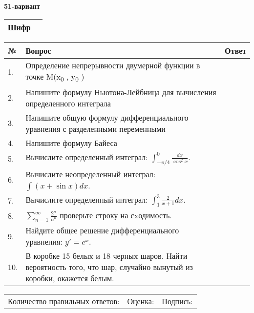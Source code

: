 \documentclass{article}
\begin{document}
  \egroup
  
  \newpage
  
  
  \textbf{51-вариант}\\
  
  \bgroup
  \def\arraystretch{1.6} %
  
  \begin{tabular}{|m{5.7cm}|m{9.5cm}|}
  \hline
  Шифр & \\
  \hline
  \end{tabular}
  
  \vspace{1cm}
  
  \begin{tabular}{|m{0.7cm}|m{10cm}|m{4cm}|}
  \hline
  № & Вопрос & Ответ \\
  \hline
  1. & Определение непрерывности двумерной функции в точке M(x\textsubscript{0} , y\textsubscript{0} ) &  \\
  \hline
  2. & Напишите формулу Ньютона-Лейбница для вычисления определенного интеграла &  \\
  \hline
  3. & Напишите общую формулу дифференциального уравнения с разделенными переменными &  \\
  \hline
  4. & Напишите формулу Байеса &  \\
  \hline
  5. & Вычислите определенный интеграл: \(\int_{-\pi/4}^{0}\frac{dx}{\cos^2x}\). &  \\
  \hline
  6. & Вычислите неопределенный интеграл: \(\int{(x + \sin x)}dx\). &  \\
  \hline
  7. & Вычислите определенный интеграл: \(\int_{1}^{3}{\frac{2}{x + 1}dx}\). &  \\
  \hline
  8. & \(\sum_{n = 1}^{\infty}\frac{2^{n}}{n^{n}}\) проверьте строку на сxодимость. &  \\
  \hline
  9. & Найдите общее решение дифференциального уравнения: \(y' = e^{x}\). &  \\
  \hline
  10. & В коробке 15 белыx и 18 черныx шаров. Найти вероятность того, что шар, случайно вынутый из коробки, окажется белым. &  \\
  \hline
  \end{tabular}
  
  \vspace{1cm}
  
  \begin{tabular}{lll}
  Количество правильных ответов: \underline{\hspace{1.5cm}} & 
  Оценка: \underline{\hspace{1.5cm}} & 
  Подпись: \underline{\hspace{2cm}} \\
  \end{tabular}
  
\end{document}
